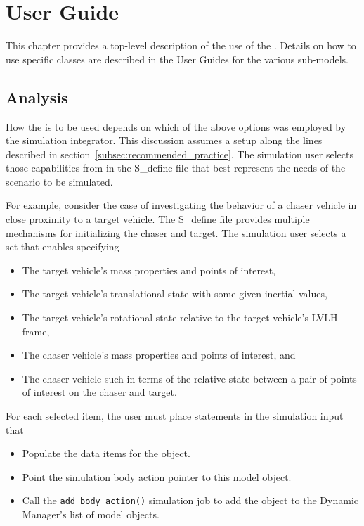 %

\chapter{User Guide}
\label{ch:overview:user}

This chapter provides a top-level description of the use of the \ModelDesc.
Details on how to use specific classes are described in the User Guides for
the various sub-models.

\section{Analysis}
How the \ModelDesc is to be used depends on which of the above options
was employed by the simulation integrator. This discussion assumes a
setup along the lines described in section~\ref{subsec:recommended_practice}.
The simulation user selects those capabilities from
in the S\_define file that best represent the needs of the scenario
to be simulated.

For example, consider the case of investigating the behavior of a chaser
vehicle in close proximity to a target vehicle. The S\_define file
provides multiple mechanisms for initializing the chaser and target.
The simulation user selects a set that enables specifying
\begin{itemize}
\item The target vehicle's mass properties and points of interest,
\item The target vehicle's translational state with some given inertial values,
\item The target vehicle's rotational state relative to the target
vehicle's LVLH frame,
\item The chaser vehicle's mass properties and points of interest, and
\item The chaser vehicle such in terms of the relative state between a pair of
points of interest on the chaser and target.
\end{itemize}

For each selected item, the user must place statements in the
simulation input that
\begin{itemize}
\item Populate the data items for the object. \\
\item Point the simulation body action pointer to this model object. \\
\item Call the {\tt add\_body\_action()} simulation job to add the
object to the Dynamic Manager's list of model objects.
\end{itemize}

